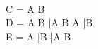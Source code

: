 \documentclass{article}
\begin{document}
\\ C = A \cap B \\
D = A \cap B \cup \bar{A} \cap B \cup A \cap \bar{B} \\
E = A \cap \bar{B} \cup \bar{A} \cap B
\end{document}

